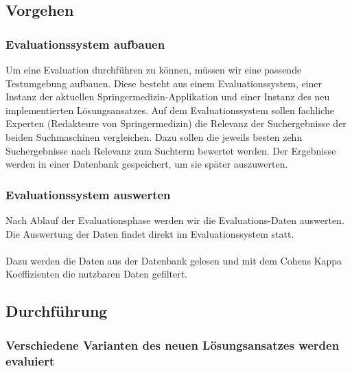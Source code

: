 \subsection{Vorgehen}
\label{sec:Evaluation:Aufbau:Vorgehen}

\subsubsection{Evaluationssystem aufbauen}
\label{sec:Evaluation:Aufbau:Vorgehen:Aufbau}

Um eine Evaluation durchführen zu können, müssen wir eine passende Testumgebung aufbauen. Diese besteht aus einem Evaluationssystem, einer Instanz der aktuellen Springermedizin-Applikation und einer Instanz des neu implementierten Lösungsansatzes. Auf dem Evaluationssystem sollen fachliche Experten (Redakteure von Springermedizin) die Relevanz der Suchergebnisse  der beiden Suchmaschinen vergleichen. Dazu sollen die jeweils besten zehn Suchergebnisse nach Relevanz zum Suchterm bewertet werden. Der Ergebnisse werden in einer Datenbank gespeichert, um sie später auszuwerten. 

\subsubsection{Evaluationssystem auswerten}
\label{sec:Evaluation:Aufbau:Vorgehen:Auswerten}

Nach Ablauf der Evaluationsphase werden wir die Evaluations-Daten auswerten. Die Auswertung der Daten findet direkt im Evaluationssystem statt. 
\\
\\
Dazu werden die Daten aus der Datenbank gelesen und mit dem Cohens Kappa Koeffizienten die nutzbaren Daten gefiltert. 

\subsection{Durchführung}
\label{sec:Evaluation:Aufbau:Durchfuehrung}

\subsubsection{Verschiedene Varianten des neuen Lösungsansatzes werden evaluiert}
\label{sec:Evaluation:Aufbau:Durchfuehrung:EvaluationsdatenVarianteLoesungsansatzes}

